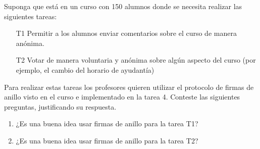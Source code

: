 Suponga que está en un curso con 150 alumnos donde se necesita realizar las siguientes tareas:
\begin{itemize}
  \item[T1] Permitir a los alumnos enviar comentarios sobre el curso de manera anónima.

  \item[T2] Votar de manera voluntaria y anónima sobre algún aspecto del curso (por ejemplo, el cambio del horario de ayudantía)
\end{itemize}    
Para realizar estas tareas los profesores quieren utilizar el protocolo de firmas de anillo visto en el curso e implementado en la tarea 4. Conteste las siguientes preguntas, justificando su respuesta.
\begin{enumerate}
\item ¿Es una buena idea usar firmas de anillo para la tarea T1? 

\item ¿Es una buena idea usar firmas de anillo para la tarea T2? 
\end{enumerate}
